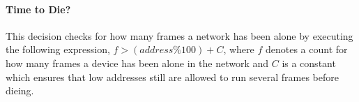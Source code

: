 \paragraph{Time to Die?}
This decision checks for how many frames a network has been alone by executing the following expression, $f > (address \% 100) + C$, where $f$ denotes a count for how many frames a device has been alone in the network and $C$ is a constant which ensures that low addresses still are allowed to run several frames before dieing.
